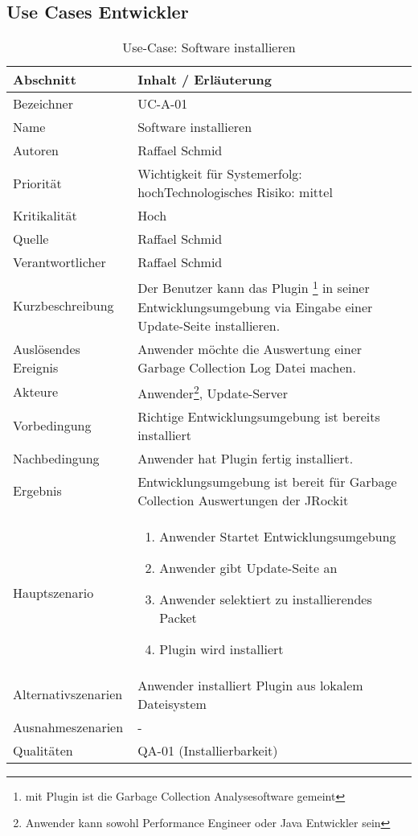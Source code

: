 \subsection{Use Cases Entwickler}
\begin{longtable}{|p{4cm}|p{10.5cm}|}
  \caption{Use-Case: Software installieren}\\\hline
   \textbf{Abschnitt} & \textbf{Inhalt / Erläuterung} \\\hline
   Bezeichner & UC-A-01\\\hline
   Name & Software installieren\\\hline
   Autoren & Raffael Schmid\\\hline
   Priorität & Wichtigkeit für Systemerfolg: hoch\newline Technologisches Risiko: mittel\\\hline
   Kritikalität & Hoch\\\hline
   Quelle & Raffael Schmid\\\hline
   Verantwortlicher & Raffael Schmid\\\hline
   Kurzbeschreibung & Der Benutzer kann das Plugin \footnote{mit Plugin ist die Garbage Collection Analysesoftware gemeint} in seiner Entwicklungsumgebung via Eingabe einer Update-Seite installieren.\\\hline
   Auslösendes Ereignis & Anwender möchte die Auswertung einer Garbage Collection Log Datei machen.\\\hline
   Akteure & Anwender\footnote{Anwender kann sowohl Performance Engineer oder Java Entwickler sein}, Update-Server\\\hline
   Vorbedingung & Richtige Entwicklungsumgebung ist bereits installiert\\\hline
   Nachbedingung & Anwender hat Plugin fertig installiert.\\\hline
   Ergebnis & Entwicklungsumgebung ist bereit für Garbage Collection Auswertungen der JRockit\\\hline
   Hauptszenario & 
         \begin{enumerate}
		\item Anwender Startet Entwicklungsumgebung
		\item Anwender gibt Update-Seite an
		\item Anwender selektiert zu installierendes Packet
		\item Plugin wird installiert	
 	\end{enumerate}
	\\\hline
   Alternativszenarien & Anwender installiert Plugin aus lokalem Dateisystem\\\hline
   Ausnahmeszenarien & -\\\hline
   Qualitäten & QA-01 (Installierbarkeit)\\\hline
\end{longtable}

